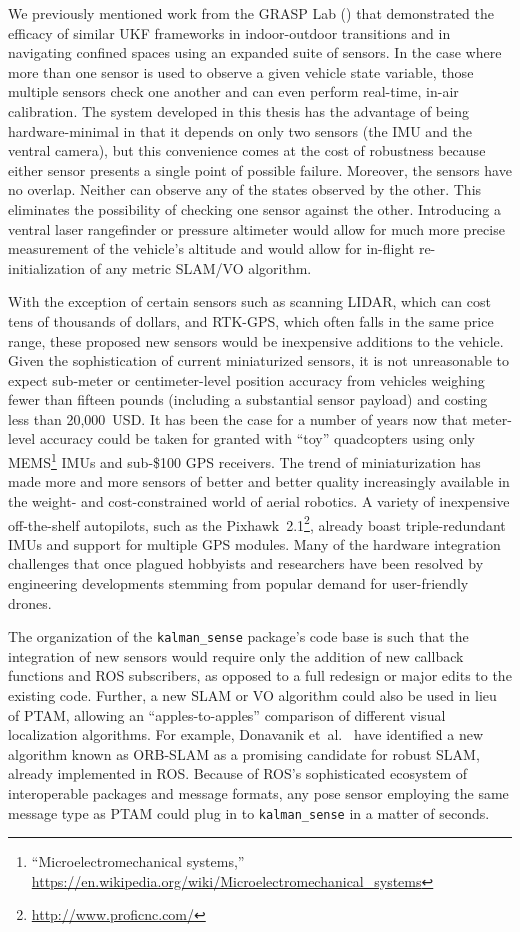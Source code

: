 We previously mentioned work from the GRASP Lab (\cite{Shen2011}) that demonstrated the efficacy of similar UKF frameworks in indoor-outdoor transitions and in navigating confined spaces using an expanded suite of sensors. In the case where more than one sensor is used to observe a given vehicle state variable, those multiple sensors check one another and can even perform real-time, in-air calibration. The system developed in this thesis has the advantage of being hardware-minimal in that it depends on only two sensors (the IMU and the ventral camera), but this convenience comes at the cost of robustness because either sensor presents a single point of possible failure. Moreover, the sensors have no overlap. Neither can observe any of the states observed by the other. This eliminates the possibility of checking one sensor against the other. Introducing a ventral laser rangefinder or pressure altimeter would allow for much more precise measurement of the vehicle's altitude and would allow for in-flight re-initialization of any metric SLAM/VO algorithm.

With the exception of certain sensors such as scanning LIDAR, which can cost tens of thousands of dollars, and RTK-GPS, which often falls in the same price range, these proposed new sensors would be inexpensive additions to the vehicle. Given the sophistication of current miniaturized sensors, it is not unreasonable to expect sub-meter or centimeter-level position accuracy from vehicles weighing fewer than fifteen pounds (including a substantial sensor payload) and costing less than 20,000~USD. It has been the case for a number of years now that meter-level accuracy could be taken for granted with ``toy'' quadcopters using only MEMS\footnote{``Microelectromechanical systems,''\\ \url{https://en.wikipedia.org/wiki/Microelectromechanical_systems}} IMUs and sub-\$100 GPS receivers. The trend of miniaturization has made more and more sensors of better and better quality increasingly available in the weight- and cost-constrained world of aerial robotics. A variety of inexpensive off-the-shelf autopilots, such as the Pixhawk~2.1\footnote{\url{http://www.proficnc.com/}}, already boast triple-redundant IMUs and support for multiple GPS modules. Many of the hardware integration challenges that once plagued hobbyists and researchers have been resolved by engineering developments stemming from popular demand for user-friendly drones.

The organization of the \texttt{kalman\_sense} package's code base is such that the integration of new sensors would require only the addition of new callback functions and ROS subscribers, as opposed to a full redesign or major edits to the existing code. Further, a new SLAM or VO algorithm could also be used in lieu of PTAM, allowing an ``apples-to-apples'' comparison of different visual localization algorithms. For example, Donavanik et~al.\ \cite{Donavanik2016} have identified a new algorithm known as ORB-SLAM \cite{Mur-Artal2015} as a promising candidate for robust SLAM, already implemented in ROS. Because of ROS's sophisticated ecosystem of interoperable packages and message formats, any pose sensor employing the same message type as PTAM could plug in to \texttt{kalman\_sense} in a matter of seconds.

